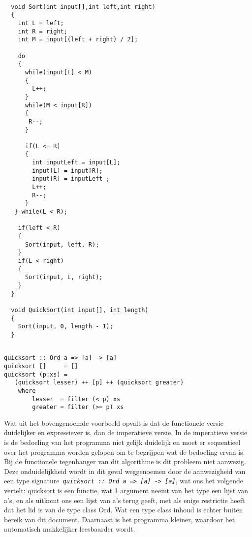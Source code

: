 \documentclass[twoside,twocolumn]{article}
\begin{document}
\begin{lstlisting}[style=framed, label=lst-quicksort-c, caption=QuickSort in C]

  void Sort(int input[],int left,int right)
  {
    int L = left;
    int R = right;
    int M = input[(left + right) / 2];

    do
    {
      while(input[L] < M)
      {
        L++;
      }
      while(M < input[R])
      {
       R--;
      }

      if(L <= R)
      {
        int inputLeft = input[L];
        input[L] = input[R];
        input[R] = inputLeft ;
        L++;
        R--;
      }
   } while(L < R);

    if(left < R)
    {
      Sort(input, left, R);
    }
    if(L < right)
    {
      Sort(input, L, right);
    }
  }

  void QuickSort(int input[], int length)
  {
    Sort(input, 0, length - 1);
  }
\end{lstlisting}

\pagebreak

\begin{lstlisting}[style=framed, label=lst-quicksort-hs, caption=QuickSort in Haskell]

quicksort :: Ord a => [a] -> [a]
quicksort []     = []
quicksort (p:xs) =
   (quicksort lesser) ++ [p] ++ (quicksort greater)
    where
        lesser  = filter (< p) xs
        greater = filter (>= p) xs
\end{lstlisting}

Wat uit het bovengenoemde voorbeeld opvalt is dat de functionele versie 
duidelijker en expressiever is, dan de imperatieve versie. In de imperatieve
versie is de bedoeling van het programma niet gelijk duidelijk en moet er
sequentieel over het programma worden gelopen om te begrijpen wat de bedoeling
ervan is. Bij de functionele tegenhanger van dit algorithme is dit probleem niet
aanwezig. Deze onduidelijkheid wordt in dit geval weggenoemen door de
aanwezigheid van een type
signature~\textit{\lstinline{quicksort :: Ord a => [a] -> [a]}}, wat ons het
volgende vertelt: quicksort is een functie, wat 1 argument neemt van het type
een lijst van a's, en als uitkomt ons een lijst van a's terug geeft, met als
enige restrictie heeft dat het lid is van de type class Ord. Wat een type class
inhoud is echter buiten bereik van dit document. Daarnaast is het programma
kleiner, waardoor het automatisch makkelijker leesbaarder wordt.

\end{document}
